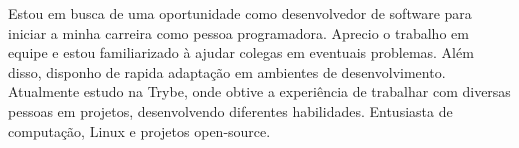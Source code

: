 

\begin{cvparagraph}


Estou em busca de uma oportunidade como desenvolvedor de software para iniciar a minha carreira como pessoa programadora. Aprecio o trabalho em equipe e estou familiarizado à ajudar colegas em eventuais problemas. Além disso, disponho de rapida adaptação em ambientes de desenvolvimento. Atualmente estudo na Trybe, onde obtive a experiência de trabalhar com diversas pessoas em projetos, desenvolvendo diferentes habilidades. Entusiasta de computação, Linux e projetos open-source.
\end{cvparagraph}
